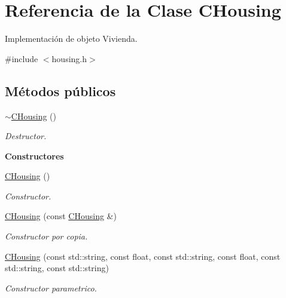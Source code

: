 \hypertarget{class_c_housing}{}\section{Referencia de la Clase C\+Housing}
\label{class_c_housing}


Implementación de objeto Vivienda.  




{\ttfamily \#include $<$housing.\+h$>$}

\subsection*{Métodos públicos}
\begin{DoxyCompactItemize}
\item 
\hyperlink{class_c_housing_a474b50df1af45c52228c7404ab18c528}{$\sim$\+C\+Housing} ()\hypertarget{class_c_housing_a474b50df1af45c52228c7404ab18c528}{}\label{class_c_housing_a474b50df1af45c52228c7404ab18c528}

\begin{DoxyCompactList}\small\item\em Destructor. \end{DoxyCompactList}\end{DoxyCompactItemize}
\begin{Indent}{\bf Constructores}\par
\begin{DoxyCompactItemize}
\item 
\hyperlink{class_c_housing_a1cbe126cc3f747dc7587a80d992473d7}{C\+Housing} ()
\begin{DoxyCompactList}\small\item\em Constructor. \end{DoxyCompactList}\item 
\hyperlink{class_c_housing_a914bdcd23b728124b169406b072386f6}{C\+Housing} (const \hyperlink{class_c_housing}{C\+Housing} \&)
\begin{DoxyCompactList}\small\item\em Constructor por copia. \end{DoxyCompactList}\item 
\hyperlink{class_c_housing_a5c593d9bb321d6aea9999c083a121c0d}{C\+Housing} (const std\+::string, const float, const std\+::string, const float, const std\+::string, const std\+::string)
\begin{DoxyCompactList}\small\item\em Constructor parametrico. \end{DoxyCompactList}\end{DoxyCompactItemize}
\end{Indent}
